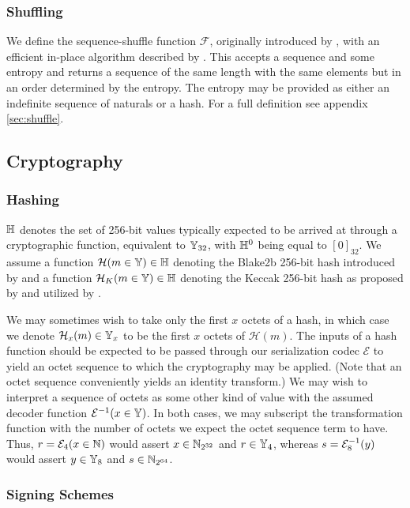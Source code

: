 \subsubsection{Shuffling}

We define the sequence-shuffle function $\mathcal{F}$, originally introduced by \cite{fisheryates1938statistical}, with an efficient in-place algorithm described by \cite{wikipedia2024fisheryates}. This accepts a sequence and some entropy and returns a sequence of the same length with the same elements but in an order determined by the entropy. The entropy may be provided as either an indefinite sequence of naturals or a hash. For a full definition see appendix \ref{sec:shuffle}.

\subsection{Cryptography}\label{sec:cryptography}

\subsubsection{Hashing}

$\mathbb{H}$ denotes the set of 256-bit values typically expected to be arrived at through a cryptographic function, equivalent to $\mathbb{Y}_{32}$, with $\mathbb{H}^0$ being equal to $[0]_{32}$. We assume a function $\mathcal{H}(m \in \mathbb{Y}) \in \mathbb{H}$ denoting the Blake2b 256-bit hash introduced by \cite{rfc7693} and a function $\mathcal{H}_K(m \in \mathbb{Y}) \in \mathbb{H}$ denoting the Keccak 256-bit hash as proposed by \cite{bertoni2013keccak} and utilized by \cite{wood2014ethereum}.

We may sometimes wish to take only the first $x$ octets of a hash, in which case we denote $\mathcal{H}_x(m) \in \mathbb{Y}_x$ to be the first $x$ octets of $\mathcal{H}(m)$. The inputs of a hash function should be expected to be passed through our serialization codec $\mathcal{E}$ to yield an octet sequence to which the cryptography may be applied. (Note that an octet sequence conveniently yields an identity transform.) We may wish to interpret a sequence of octets as some other kind of value with the assumed decoder function $\mathcal{E}^{-1}(x \in \mathbb{Y})$. In both cases, we may subscript the transformation function with the number of octets we expect the octet sequence term to have. Thus, $r = \mathcal{E}_4(x \in \mathbb{N})$ would assert $x \in \mathbb{N}_{2^{32}}$ and $r \in \mathbb{Y}_4$, whereas $s = \mathcal{E}^{-1}_8(y)$ would assert $y \in \mathbb{Y}_8$ and $s \in \mathbb{N}_{2^{64}}$.

\subsubsection{Signing Schemes}\label{sec:signing}

